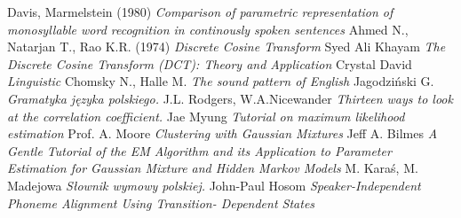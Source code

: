 \documentclass[12pt,a4paper,english]{article}
\begin{document}
\begin{thebibliography}{99}
\bibitem{} Davis, Marmelstein (1980) \emph{Comparison of parametric representation of monosyllable word recognition in continously spoken sentences}
\bibitem{} Ahmed N., Natarjan T., Rao K.R. (1974) \emph{Discrete Cosine Transform}
\bibitem{} Syed Ali Khayam \emph{The Discrete Cosine Transform (DCT): Theory and Application} 
\bibitem{} Crystal David \emph{Linguistic}
\bibitem{} Chomsky N., Halle M. \emph{The sound pattern of English}
\bibitem{} Jagodziński G. \emph{Gramatyka języka polskiego.}
\bibitem{} J.L. Rodgers, W.A.Nicewander \emph{Thirteen ways to look at the correlation coefficient.}
\bibitem{} Jae Myung \emph{Tutorial on maximum likelihood estimation}
\bibitem{} Prof. A. Moore \emph{Clustering with Gaussian Mixtures}
\bibitem{} Jeff A. Bilmes \emph{A Gentle Tutorial of the EM Algorithm and its Application to Parameter Estimation for Gaussian Mixture and Hidden Markov Models}
\bibitem{} M. Karaś, M. Madejowa \emph{Słownik wymowy polskiej.}
\bibitem{} John-Paul Hosom \emph{Speaker-Independent Phoneme Alignment Using Transition- Dependent States}
\end{thebibliography}
\end{document}

